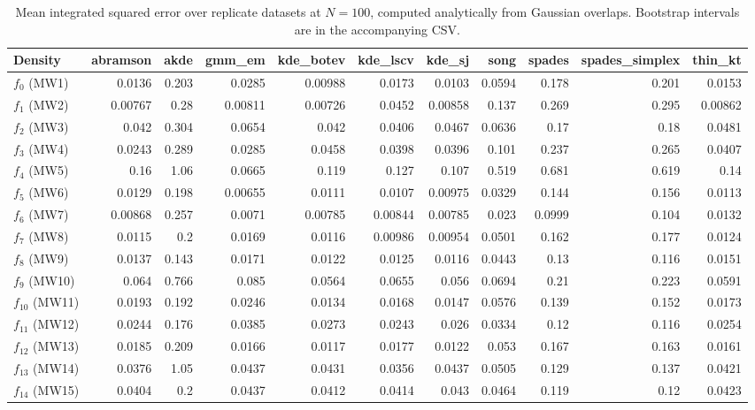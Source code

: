 \begin{table}[htbp]
\centering
\caption{Mean integrated squared error over replicate datasets at $N=100$, computed analytically from Gaussian overlaps. Bootstrap intervals are in the accompanying CSV.}
\label{tab:ise-N100}
\begin{tabular}{lrrrrrrrrrr}
\toprule
Density & abramson & akde & gmm\_em & kde\_botev & kde\_lscv & kde\_sj & song & spades & spades\_simplex & thin\_kt \\
\midrule
$f_{0}$ (MW1) & 0.0136 & 0.203 & 0.0285 & 0.00988 & 0.0173 & 0.0103 & 0.0594 & 0.178 & 0.201 & 0.0153 \\
$f_{1}$ (MW2) & 0.00767 & 0.28 & 0.00811 & 0.00726 & 0.0452 & 0.00858 & 0.137 & 0.269 & 0.295 & 0.00862 \\
$f_{2}$ (MW3) & 0.042 & 0.304 & 0.0654 & 0.042 & 0.0406 & 0.0467 & 0.0636 & 0.17 & 0.18 & 0.0481 \\
$f_{3}$ (MW4) & 0.0243 & 0.289 & 0.0285 & 0.0458 & 0.0398 & 0.0396 & 0.101 & 0.237 & 0.265 & 0.0407 \\
$f_{4}$ (MW5) & 0.16 & 1.06 & 0.0665 & 0.119 & 0.127 & 0.107 & 0.519 & 0.681 & 0.619 & 0.14 \\
$f_{5}$ (MW6) & 0.0129 & 0.198 & 0.00655 & 0.0111 & 0.0107 & 0.00975 & 0.0329 & 0.144 & 0.156 & 0.0113 \\
$f_{6}$ (MW7) & 0.00868 & 0.257 & 0.0071 & 0.00785 & 0.00844 & 0.00785 & 0.023 & 0.0999 & 0.104 & 0.0132 \\
$f_{7}$ (MW8) & 0.0115 & 0.2 & 0.0169 & 0.0116 & 0.00986 & 0.00954 & 0.0501 & 0.162 & 0.177 & 0.0124 \\
$f_{8}$ (MW9) & 0.0137 & 0.143 & 0.0171 & 0.0122 & 0.0125 & 0.0116 & 0.0443 & 0.13 & 0.116 & 0.0151 \\
$f_{9}$ (MW10) & 0.064 & 0.766 & 0.085 & 0.0564 & 0.0655 & 0.056 & 0.0694 & 0.21 & 0.223 & 0.0591 \\
$f_{10}$ (MW11) & 0.0193 & 0.192 & 0.0246 & 0.0134 & 0.0168 & 0.0147 & 0.0576 & 0.139 & 0.152 & 0.0173 \\
$f_{11}$ (MW12) & 0.0244 & 0.176 & 0.0385 & 0.0273 & 0.0243 & 0.026 & 0.0334 & 0.12 & 0.116 & 0.0254 \\
$f_{12}$ (MW13) & 0.0185 & 0.209 & 0.0166 & 0.0117 & 0.0177 & 0.0122 & 0.053 & 0.167 & 0.163 & 0.0161 \\
$f_{13}$ (MW14) & 0.0376 & 1.05 & 0.0437 & 0.0431 & 0.0356 & 0.0437 & 0.0505 & 0.129 & 0.137 & 0.0421 \\
$f_{14}$ (MW15) & 0.0404 & 0.2 & 0.0437 & 0.0412 & 0.0414 & 0.043 & 0.0464 & 0.119 & 0.12 & 0.0423 \\
\bottomrule
\end{tabular}
\end{table}

